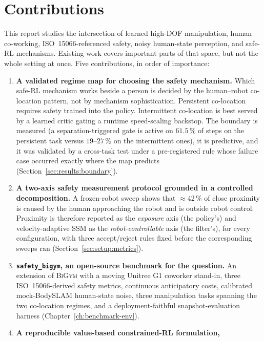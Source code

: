 \documentclass[11pt,a4paper]{report}
\newcommand{\ssm}{SSM}
\newcommand{\iso}{ISO~15066}
\newcommand{\bigym}{\textsc{BiGym}}
\newcommand{\sbigym}{\texttt{safety\_bigym}}
\newcommand{\bodyslampp}{BodySLAM\nolinebreak[4]\hspace{-.05em}\raisebox{.2ex}{\scriptsize ++}}
\begin{document}
\section{Contributions}
\label{sec:intro:contributions}

This report studies the intersection of learned high-DOF manipulation,
human co-working, \iso{}-referenced safety, noisy human-state
perception, and safe-RL mechanisms. Existing work covers important
parts of that space, but not the whole setting at once. Five
contributions, in order of importance:

\begin{enumerate}[leftmargin=2em,topsep=2pt,itemsep=2pt]
\item \textbf{A validated regime map for choosing the safety
  mechanism.} Which safe-RL mechanism works beside a person is
  decided by the human--robot co-location pattern, not by mechanism
  sophistication. Persistent co-location requires safety trained into
  the policy. Intermittent co-location is best served by a learned
  critic gating a runtime speed-scaling backstop. The boundary is
  measured (a separation-triggered gate is active on $61.5\,\%$ of
  steps on the persistent task versus $19$--$27\,\%$ on the
  intermittent ones), it is predictive, and it was validated by a
  cross-task test under a pre-registered rule whose failure case
  occurred exactly where the map predicts
  (Section~\ref{sec:results:boundary}).
\item \textbf{A two-axis safety measurement protocol grounded in a
  controlled decomposition.} A frozen-robot sweep shows that
  $\approx$42\,\% of close proximity is caused by the human
  approaching the robot and is outside robot control. Proximity is
  therefore reported as the \emph{exposure} axis (the policy's) and
  velocity-adaptive \ssm{} as the \emph{robot-controllable} axis (the
  filter's), for every configuration, with three accept/reject rules
  fixed before the corresponding sweeps ran
  (Section~\ref{sec:setup:metrics}).
\item \textbf{\sbigym{}, an open-source benchmark for the question.}
  An extension of \bigym{} with a moving Unitree G1 coworker
  stand-in, three \iso{}-derived safety metrics, continuous
  anticipatory costs, calibrated mock-\bodyslampp{} human-state
  noise, three manipulation tasks spanning the two co-location
  regimes, and a deployment-faithful snapshot-evaluation harness
  (Chapter~\ref{ch:benchmark-env}).
\item \textbf{A reproducible value-based constrained-RL formulation,
}
\end{enumerate}
\end{document}
